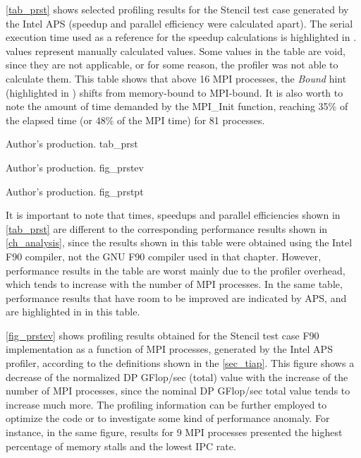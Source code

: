 \autoref {tab_prst} shows selected profiling results for the Stencil test case generated by the Intel APS (speedup and parallel efficiency were calculated apart). The serial execution time used as a reference for the speedup calculations is highlighted in .  values represent manually calculated values. Some values in the table are void, since they are not applicable, or for some reason, the profiler was not able to calculate them. This table shows that above 16 MPI processes, the \textit {Bound} hint (highlighted in ) shifts from memory-bound to MPI-bound. It is also worth to note the amount of time demanded by the  MPI\_Init function, reaching 35\% of the elapsed time (or 48\% of the MPI time) for 81 processes. 

     {Author's production.} {tab_prst}

     {Author's production.} {fig_prstev}

     {Author's production.} {fig_prstpt}

It is important to note that times, speedups and parallel efficiencies shown in \autoref {tab_prst} are different to the corresponding performance results shown in \autoref {ch_analysis}, since the results shown in this table were obtained using the Intel F90 compiler, not the GNU F90 compiler used in that chapter. However, performance results in the table are worst mainly due to the profiler overhead, which tends to increase with the number of MPI processes. In the same table, performance results that have room to be improved are indicated by APS, and are highlighted in  in this table. 

\autoref {fig_prstev} shows profiling results obtained for the Stencil test case F90 implementation as a function of MPI processes, generated by the Intel APS profiler, according to the definitions shown in the \autoref {sec_tiap}. This figure shows a decrease of the normalized DP GFlop/sec (total) value with the increase of the number of MPI processes, since the nominal DP GFlop/sec total value tends to increase much more. The profiling information can be further employed to optimize the code or to investigate some kind of performance anomaly. For instance, in the same figure, results for 9 MPI processes presented the highest percentage of memory stalls and the lowest IPC rate.

